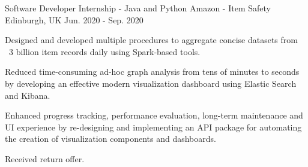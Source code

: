 \begin{cventries}
  \cventry
    {Software Developer Internship - Java and Python} %
    {Amazon - Item Safety} %
    {Edinburgh, UK} %
    {Jun. 2020 - Sep. 2020} %
    {
      \begin{cvitems} %
        \item {Designed and developed multiple procedures to aggregate concise datasets from ~3 billion item records daily using Spark-based tools.}
        \item {Reduced time-consuming ad-hoc graph analysis from tens of minutes to seconds by developing an effective modern visualization dashboard using Elastic Search and Kibana.}
        \item {Enhanced progress tracking, performance evaluation, long-term maintenance and UI experience by re-designing and implementing an API package for automating the creation of visualization components and dashboards.}
        \item {Received return offer.}
      \end{cvitems}
    }


\end{cventries}
